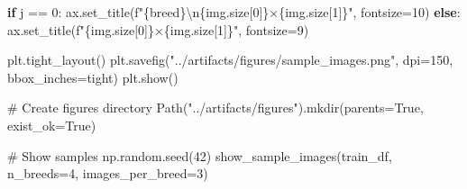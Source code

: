 \documentclass[
  letterpaper,
  DIV=11,
  numbers=noendperiod]{scrartcl}
\newenvironment{Shaded}{\begin{snugshade}}{\end{snugshade}}
\newcommand{\CharTok}[1]{\textcolor[rgb]{0.13,0.47,0.30}{#1}}
\newcommand{\CommentTok}[1]{\textcolor[rgb]{0.37,0.37,0.37}{#1}}
\newcommand{\ControlFlowTok}[1]{\textcolor[rgb]{0.00,0.23,0.31}{\textbf{#1}}}
\newcommand{\DecValTok}[1]{\textcolor[rgb]{0.68,0.00,0.00}{#1}}
\newcommand{\NormalTok}[1]{\textcolor[rgb]{0.00,0.23,0.31}{#1}}
\newcommand{\OperatorTok}[1]{\textcolor[rgb]{0.37,0.37,0.37}{#1}}
\newcommand{\SpecialCharTok}[1]{\textcolor[rgb]{0.37,0.37,0.37}{#1}}
\newcommand{\SpecialStringTok}[1]{\textcolor[rgb]{0.13,0.47,0.30}{#1}}
\newcommand{\StringTok}[1]{\textcolor[rgb]{0.13,0.47,0.30}{#1}}
\newcommand{\VariableTok}[1]{\textcolor[rgb]{0.07,0.07,0.07}{#1}}
\renewenvironment{Shaded}{%
  \begin{tcolorbox}[%
    enhanced,%
    colback=codebg,%
    colframe=codebg,%
    borderline west={3pt}{0pt}{sectionblue},%
    boxrule=0pt,%
    arc=0pt,%
    boxsep=5pt,%
    left=2mm,%
    right=2mm,%
    top=2mm,%
    bottom=2mm%
  ]%
}{%
  \end{tcolorbox}%
}
\begin{document}
\begin{Shaded}
\begin{Highlighting}[]
            \ControlFlowTok{if}\NormalTok{ j }\OperatorTok{==} \DecValTok{0}\NormalTok{:}
\NormalTok{                ax.set\_title(}\SpecialStringTok{f"}\SpecialCharTok{\{}\NormalTok{breed}\SpecialCharTok{\}}\CharTok{\textbackslash{}n}\SpecialCharTok{\{}\NormalTok{img}\SpecialCharTok{.}\NormalTok{size[}\DecValTok{0}\NormalTok{]}\SpecialCharTok{\}}\SpecialStringTok{×}\SpecialCharTok{\{}\NormalTok{img}\SpecialCharTok{.}\NormalTok{size[}\DecValTok{1}\NormalTok{]}\SpecialCharTok{\}}\SpecialStringTok{"}\NormalTok{, fontsize}\OperatorTok{=}\DecValTok{10}\NormalTok{)}
            \ControlFlowTok{else}\NormalTok{:}
\NormalTok{                ax.set\_title(}\SpecialStringTok{f"}\SpecialCharTok{\{}\NormalTok{img}\SpecialCharTok{.}\NormalTok{size[}\DecValTok{0}\NormalTok{]}\SpecialCharTok{\}}\SpecialStringTok{×}\SpecialCharTok{\{}\NormalTok{img}\SpecialCharTok{.}\NormalTok{size[}\DecValTok{1}\NormalTok{]}\SpecialCharTok{\}}\SpecialStringTok{"}\NormalTok{, fontsize}\OperatorTok{=}\DecValTok{9}\NormalTok{)}
    
\NormalTok{    plt.tight\_layout()}
\NormalTok{    plt.savefig(}\StringTok{"../artifacts/figures/sample\_images.png"}\NormalTok{, }
\NormalTok{                dpi}\OperatorTok{=}\DecValTok{150}\NormalTok{, bbox\_inches}\OperatorTok{=}\StringTok{\textquotesingle{}tight\textquotesingle{}}\NormalTok{)}
\NormalTok{    plt.show()}

\CommentTok{\# Create figures directory}
\NormalTok{Path(}\StringTok{"../artifacts/figures"}\NormalTok{).mkdir(parents}\OperatorTok{=}\VariableTok{True}\NormalTok{, exist\_ok}\OperatorTok{=}\VariableTok{True}\NormalTok{)}

\CommentTok{\# Show samples}
\NormalTok{np.random.seed(}\DecValTok{42}\NormalTok{)}
\NormalTok{show\_sample\_images(train\_df, n\_breeds}\OperatorTok{=}\DecValTok{4}\NormalTok{, images\_per\_breed}\OperatorTok{=}\DecValTok{3}\NormalTok{)}
\end{Highlighting}
\end{Shaded}
\end{document}
